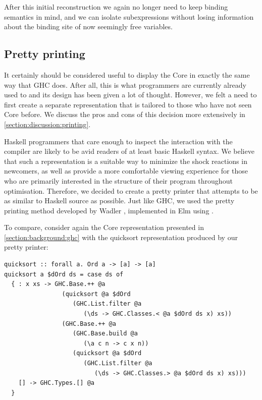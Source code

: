 After this initial reconstruction we again no longer need to keep binding semantics in mind, and we can isolate
subexpressions without losing information about the binding site of now seemingly free variables.

\subsection{Pretty printing}

It certainly should be considered useful to display the Core in exactly the same way that
GHC does. After all, this is what programmers are currently already used to and its design
has been given a lot of thought. However, we felt a need to first create a separate representation
that is tailored to those who have not seen Core before. We discuss the pros and cons of this decision
more extensively in \cref{section:discussion:printing}.

Haskell programmers that care enough to inspect the interaction with the compiler are likely to be
avid readers of at least basic Haskell syntax. We believe that such a representation is a suitable way to minimize the shock reactions in newcomers, as well as
provide a more comfortable viewing experience for those who are primarily interested in the structure of their program
throughout optimisation.
Therefore, we decided to create a pretty printer that attempts
to be as similar to Haskell source as possible. Just like GHC, we used the pretty printing method developed 
by Wadler \cite{prettier_printer}, implemented in Elm using  \cite{prettier_printer_elm}.


To compare, consider again the Core representation presented in \cref{section:background:ghc} with the quicksort
representation produced by our pretty printer:

\begin{listing}[H]
\begin{verbatim}
quicksort :: forall a. Ord a -> [a] -> [a]
quicksort a $dOrd ds = case ds of
  { : x xs -> GHC.Base.++ @a
                (quicksort @a $dOrd
                   (GHC.List.filter @a
                      (\ds -> GHC.Classes.< @a $dOrd ds x) xs))
                (GHC.Base.++ @a
                   (GHC.Base.build @a
                      (\a c n -> c x n))
                   (quicksort @a $dOrd
                      (GHC.List.filter @a
                         (\ds -> GHC.Classes.> @a $dOrd ds x) xs)))
    [] -> GHC.Types.[] @a
  }
\end{verbatim}
\end{listing}

